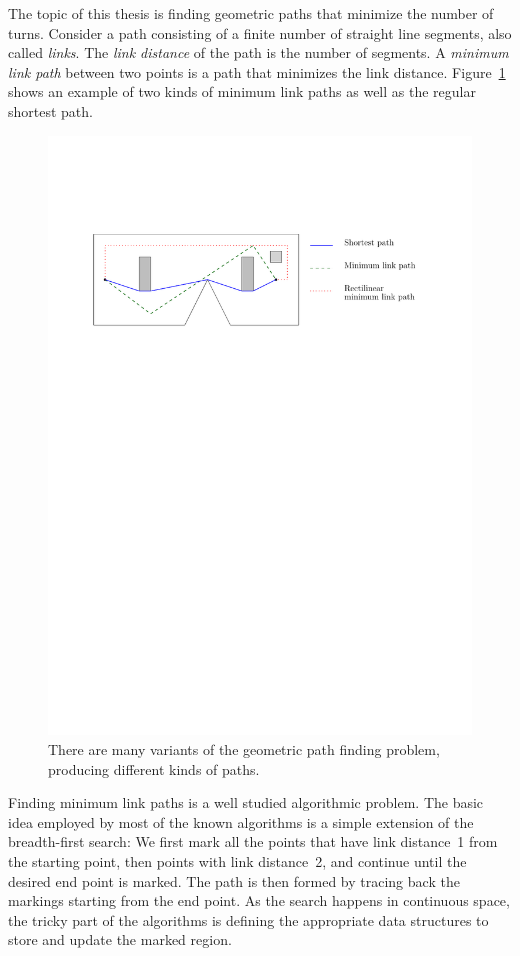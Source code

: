 \documentclass[english,gradu]{tktltiki2018}
\begin{document}
The topic of this thesis is finding geometric paths that minimize the number of turns.
Consider a path consisting of a finite number of straight line segments, also called \emph{links}.
The \emph{link distance} of the path is the number of segments.
A \emph{minimum link path} between two points is a path that minimizes the link distance.
Figure~\ref{fig:paths} shows an example of two kinds of minimum link paths as well as the regular shortest path.

\begin{figure}\centering
	\includegraphics[width=\textwidth]{fig/paths}
	\caption{There are many variants of the geometric path finding problem, producing different kinds of paths.}\label{fig:paths}
\end{figure}

Finding minimum link paths is a well studied algorithmic problem\cite{dasnar,de1991,de1992,fitch,handbook,restricted,wagner}.
The basic idea employed by most of the known algorithms is a simple extension of the breadth-first search:
We first mark all the points that have link distance~1 from the starting point, then points with link distance~2, and continue until the desired end point is marked.
The path is then formed by tracing back the markings starting from the end point.
As the search happens in continuous space, the tricky part of the algorithms is defining the appropriate data structures to store and update the marked region.
\end{document}
